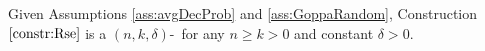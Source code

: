 \begin{theorem}
Given Assumptions \ref{ass:avgDecProb} and \ref{ass:GoppaRandom}, Construction $\ref{constr:Rse}$ is a $(n,k,\delta)$-\RSE\ for any $n \geq k > 0$ and constant $\delta > 0$.
\end{theorem}